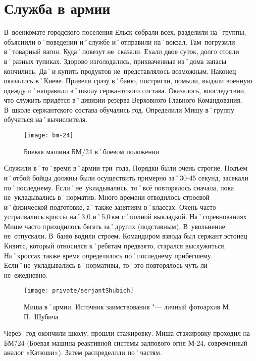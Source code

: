 ﻿\chapter{Служба в армии}
В~военкомате городского поселения Ельск собрали всех, разделили на˚группы, объяснили о˚поведении и˚службе и˚отправили на˚вокзал. Там~погрузили в˚товарный вагон. Куда˚повезут не~сказали. Ехали двое суток, долго стояли в˚разных тупиках. Здорово изголодались, прихваченные из˚дома запасы кончились. Да˚и купить продуктов не~представлялось возможным. Наконец оказались в˚Киеве. Привели сразу в˚баню, постригли, помыли, выдали военную одежду и˚направили в˚школу сержантского состава. Оказалось, впоследствии, что служить придётся в˚дивизии резерва Верховного Главного Командования. В~школе сержантского состава обучались год. Определили Мишу в˚группу обучаться на˚вычислителя.

\begin{wrapfigure}{O}{.4\textwidth}
\centering
\texttt{[image: bm-24]}
\caption[Боевая машина БМ\=/24 в˚боевом положении]{Боевая машина БМ\=/24 в˚боевом положении\footnotemark}
\label{fig:bm-24}
\end{wrapfigure}

Служили в˚то˚время в˚армии три~года. Порядки были очень строгие. Подъём и˚отбой бойцы должны были осуществить примерно за˚30-45 секунд, засекали по˚последнему. Если˚не~укладывались, то˚всё повторялось сначала, пока не~укладывались в˚норматив. Много времени отводилось строевой и˚физической подготовке, а˚также занятиям в˚классах. Очень часто устраивались кроссы на˚3,0 и˚5,0\,км с˚полной выкладкой. На˚соревнованиях Мише часто приходилось бегать за˚других (подставным). В~увольнение не~отпускали. В~баню водили строем. Командиром взвода был сержант эстонец Кивитс, который относился к˚ребятам предвзято, старался выслужиться. На˚кроссах также время определялось по˚последнему прибегшему. Если˚не~укладывались в˚нормативы, то˚это повторялось чуть ли не~ежедневно.


\begin{figure}[H]
\texttt{[image: private/serjantShubich]}
\caption{Миша в˚армии. Источник заимствования "--- личный фотоархив М.\,П.~Шубича}
\label{fig:serjantShubich}
\end{figure}


Через˚год окончили школу, прошли стажировку. Миша стажировку проходил на БМ\=/24 (Боевая машина реактивной системы залпового огня М-24, современный аналог «Катюши»). Затем распределили по˚частям. 

